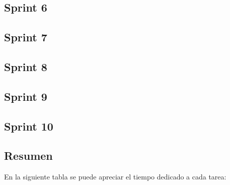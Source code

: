\subsection{Sprint 6}
\subsection{Sprint 7}
\subsection{Sprint 8}
\subsection{Sprint 9}
\subsection{Sprint 10}

\subsection{Resumen}
En la siguiente tabla se puede apreciar el tiempo dedicado a cada tarea:



